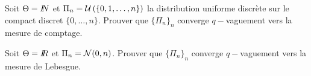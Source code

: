 \begin{exec}
Soit $\Theta=I\!\!N$ et $\Pi_n= {\cal{U}}\left(\left\{0,1,\ldots,n\right\}\right)$ la distribution uniforme discrète sur le compact discret $\{0,\ldots,n\}$.  Prouver que $\{\Pi_n\}_n$ converge $q-$vaguement vers la mesure de comptage.
\end{exec}

\if{} \vspace{1cm} 
\fi
\vspace{0.5cm}




\begin{exec}
Soit $\Theta=I\!\!R$ et $\Pi_n= {\cal{N}}(0,n)$. Prouver que $\{\Pi_n\}_n$ converge $q-$vaguement vers la mesure de Lebesgue.
\end{exec}

\if{} \vspace{1cm} 
\fi
\vspace{0.5cm}





